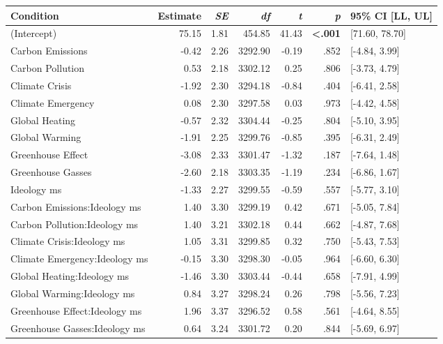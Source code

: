 \begin{table}[ht]
\centering
\begin{tabular}{lrrrrrl}
  \hline
Condition & Estimate & \textit{SE} & \textit{df} & \textit{t} & \textit{p} & 95\% CI [LL, UL] \\ 
  \hline
(Intercept) & 75.15 & 1.81 & 454.85 & 41.43 & \textbf{\textless  .001} & [71.60, 78.70] \\ 
  Carbon Emissions & -0.42 & 2.26 & 3292.90 & -0.19 & .852 & [-4.84, 3.99] \\ 
  Carbon Pollution & 0.53 & 2.18 & 3302.12 & 0.25 & .806 & [-3.73, 4.79] \\ 
  Climate Crisis & -1.92 & 2.30 & 3294.18 & -0.84 & .404 & [-6.41, 2.58] \\ 
  Climate Emergency & 0.08 & 2.30 & 3297.58 & 0.03 & .973 & [-4.42, 4.58] \\ 
  Global Heating & -0.57 & 2.32 & 3304.44 & -0.25 & .804 & [-5.10, 3.95] \\ 
  Global Warming & -1.91 & 2.25 & 3299.76 & -0.85 & .395 & [-6.31, 2.49] \\ 
  Greenhouse Effect & -3.08 & 2.33 & 3301.47 & -1.32 & .187 & [-7.64, 1.48] \\ 
  Greenhouse Gasses & -2.60 & 2.18 & 3303.35 & -1.19 & .234 & [-6.86, 1.67] \\ 
  Ideology ms & -1.33 & 2.27 & 3299.55 & -0.59 & .557 & [-5.77, 3.10] \\ 
  Carbon Emissions:Ideology ms & 1.40 & 3.30 & 3299.19 & 0.42 & .671 & [-5.05, 7.84] \\ 
  Carbon Pollution:Ideology ms & 1.40 & 3.21 & 3302.18 & 0.44 & .662 & [-4.87, 7.68] \\ 
  Climate Crisis:Ideology ms & 1.05 & 3.31 & 3299.85 & 0.32 & .750 & [-5.43, 7.53] \\ 
  Climate Emergency:Ideology ms & -0.15 & 3.30 & 3298.30 & -0.05 & .964 & [-6.60, 6.30] \\ 
  Global Heating:Ideology ms & -1.46 & 3.30 & 3303.44 & -0.44 & .658 & [-7.91, 4.99] \\ 
  Global Warming:Ideology ms & 0.84 & 3.27 & 3298.24 & 0.26 & .798 & [-5.56, 7.23] \\ 
  Greenhouse Effect:Ideology ms & 1.96 & 3.37 & 3296.52 & 0.58 & .561 & [-4.64, 8.55] \\ 
  Greenhouse Gasses:Ideology ms & 0.64 & 3.24 & 3301.72 & 0.20 & .844 & [-5.69, 6.97] \\ 
   \hline
\end{tabular}
\end{table}
